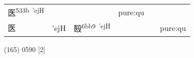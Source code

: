 \documentclass[14pt,a4paper]{scrartcl}
\begin{document}
\begin{longtable}[c]{@{}llllll@{}}
\begin{minipage}[t]{0.14\columnwidth}\raggedright\strut
医\textsuperscript{533b~'ejH}
\strut\end{minipage} &
\begin{minipage}[t]{0.14\columnwidth}\raggedright\strut
\strut\end{minipage} &
\begin{minipage}[t]{0.14\columnwidth}\raggedright\strut
\strut\end{minipage} &
\begin{minipage}[t]{0.14\columnwidth}\raggedright\strut
pure:qu
\strut\end{minipage}\tabularnewline
\begin{minipage}[t]{0.14\columnwidth}\raggedright\strut
医
\strut\end{minipage} &
\begin{minipage}[t]{0.14\columnwidth}\raggedright\strut
'ejH
\strut\end{minipage} &
\begin{minipage}[t]{0.14\columnwidth}\raggedright\strut
殹\textsuperscript{6bb9~'ejH}
\strut\end{minipage} &
\begin{minipage}[t]{0.14\columnwidth}\raggedright\strut
\strut\end{minipage} &
\begin{minipage}[t]{0.14\columnwidth}\raggedright\strut
\strut\end{minipage} &
\begin{minipage}[t]{0.14\columnwidth}\raggedright\strut
pure:qu
\strut\end{minipage}\tabularnewline
\bottomrule
\end{longtable}

(165) 0590 {[}2{]}
\end{document}
